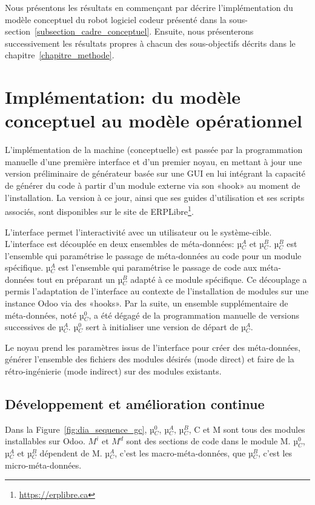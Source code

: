 \label{sec:Theme2}

Nous présentons les résultats en commençant par décrire l’implémentation du modèle conceptuel du robot logiciel codeur présenté dans la sous-section~\ref{subsection_cadre_conceptuel}. Ensuite, nous présenterons successivement les résultats propres à chacun des sous-objectifs décrits dans le chapitre~\ref{chapitre_methode}.

\section{Implémentation: du modèle conceptuel au modèle opérationnel}

L’implémentation de la machine (conceptuelle) est passée par la programmation manuelle d’une première interface et d’un premier noyau, en mettant à jour une version préliminaire de générateur basée sur une GUI\cite{bluiksnot_repo} en lui intégrant la capacité de générer du code à partir d’un module externe via son «hook» au moment de l’installation. La version à ce jour, ainsi que ses guides d’utilisation et ses scripts associés, sont disponibles sur le site de ERPLibre\footnote{\url{https://erplibre.ca}}.

L’interface permet l’interactivité avec un utilisateur ou le système-cible. L’interface est découplée en deux ensembles de méta-données: µ$_C^A$ et µ$_C^B$. µ$_C^B$ est l’ensemble qui paramétrise le passage de méta-données au code pour un module spécifique. µ$_C^A$ est l’ensemble qui paramétrise le passage de code aux méta-données tout en préparant un µ$_C^B$ adapté à ce module spécifique. Ce découplage a permis l’adaptation de l’interface au contexte de l’installation de modules sur une instance Odoo via des «hooks». Par la suite, un ensemble supplémentaire de méta-données, noté µ$_C^0$, a été dégagé de la programmation manuelle de versions successives de µ$_C^A$. µ$_C^0$ sert à initialiser une version de départ de µ$_C^A$.

Le noyau prend les paramètres issus de l’interface pour créer des méta-données, générer l’ensemble des fichiers des modules désirés (mode direct) et faire de la rétro-ingénierie (mode indirect) sur des modules existants.

\subsection{Développement et amélioration continue}

Dans la Figure~\ref{fig:dia_sequence_gc}, µ$_C^0$, µ$_C^A$, µ$_C^B$, C et M sont tous des modules installables sur Odoo. $M^i$ et $M^d$ sont des sections de code dans le module M. µ$_C^0$, µ$_C^A$ et µ$_C^B$ dépendent de M. µ$_C^A$, c’est les macro-méta-données, que µ$_C^B$, c’est les micro-méta-données.

